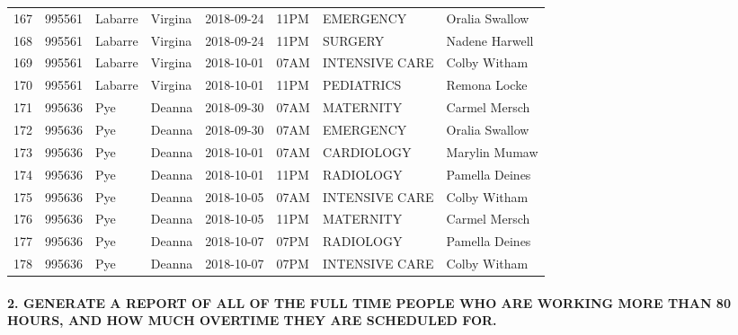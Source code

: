 \documentclass[11pt]{article}
\begin{document}
\begin{tabular}{|l|l|l|l|l|l|l|l|}
	167 &  995561 &   Labarre &   Virgina &      2018-09-24 &  11PM &       EMERGENCY &   Oralia Swallow \\
	168 &  995561 &   Labarre &   Virgina &      2018-09-24 &  11PM &         SURGERY &   Nadene Harwell \\
	169 &  995561 &   Labarre &   Virgina &      2018-10-01 &  07AM &  INTENSIVE CARE &     Colby Witham \\
	170 &  995561 &   Labarre &   Virgina &      2018-10-01 &  11PM &      PEDIATRICS &     Remona Locke \\
	171 &  995636 &       Pye &    Deanna &      2018-09-30 &  07AM &       MATERNITY &    Carmel Mersch \\
	172 &  995636 &       Pye &    Deanna &      2018-09-30 &  07AM &       EMERGENCY &   Oralia Swallow \\
	173 &  995636 &       Pye &    Deanna &      2018-10-01 &  07AM &      CARDIOLOGY &    Marylin Mumaw \\
	174 &  995636 &       Pye &    Deanna &      2018-10-01 &  11PM &       RADIOLOGY &   Pamella Deines \\
	175 &  995636 &       Pye &    Deanna &      2018-10-05 &  07AM &  INTENSIVE CARE &     Colby Witham \\
	176 &  995636 &       Pye &    Deanna &      2018-10-05 &  11PM &       MATERNITY &    Carmel Mersch \\
	177 &  995636 &       Pye &    Deanna &      2018-10-07 &  07PM &       RADIOLOGY &   Pamella Deines \\
	178 &  995636 &       Pye &    Deanna &      2018-10-07 &  07PM &  INTENSIVE CARE &     Colby Witham \\
	\bottomrule
\end{tabular}

\newpage


    \paragraph{2. GENERATE A REPORT OF ALL OF THE FULL TIME PEOPLE WHO ARE
WORKING MORE THAN 80 HOURS, AND HOW MUCH OVERTIME THEY ARE SCHEDULED
FOR.}\label{generate-a-report-of-all-of-the-full-time-people-who-are-working-more-than-80-hours-and-how-much-overtime-they-are-scheduled-for.}
\end{document}
